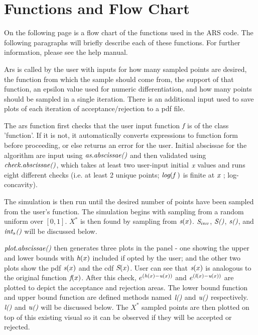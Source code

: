 \documentclass{article}\usepackage[]{graphicx}\usepackage[]{color}
\begin{document}
\section{Functions and Flow Chart}

On the following page is a flow chart of the functions used in the ARS code.  The following paragraphs will briefly describe each of these functions.  For further information, please see the help manual. 

Ars is called by the user with inputs for how many sampled points are desired, the function from which the sample should come from, the support of that function, an epsilon value used for numeric differentiation, and how many points should be sampled in a single iteration.  There is an additional input used to save plots of each iteration of acceptance$/$rejection to a pdf file.  

The ars function first checks that the user input function $\emph{f}$ is of the class 'function'.  If it is not, it automatically converts expressions to function form before proceeding, or else returns an error for the user.  Initial abscissae for the algorithm are input using $\emph{as.abscissae()}$ and then validated using $\emph{check.abscissae()}$, which takes at least two user-input initial $\emph{x}$ values and runs eight different checks (i.e. at least 2 unique points; $\emph{log}(\emph{f })$ is finite at $\emph{x }$; log-concavity). 

The simulation is then run until the desired number of points have been sampled from the user's function.  The simulation begins with sampling from a random uniform over $[0, 1]$.  $X^*$ is then found by sampling from $\emph{s}(x)$. $\emph{S}_{inv}$, $\emph{S}\emph{()}$, $\emph{s}\emph{()}$, and $\emph{int}_{s}\emph{()}$ will be discussed below.

$\emph{plot.abscissae()}$ then generates three plots in the panel - one showing the upper and lower bounds with $\emph{h}(x)$ included if opted by the user; and the other two plots show the pdf $\emph{s}(x)$ and the cdf $\emph{S}(x)$.  User can see that $\emph{s}(x)$ is analogous to the original function $\emph{f}(x)$.  After this check, $e^{( \emph{h}(x) - \emph{u}(x) )}$ and $e^{( \emph{l}(x) - \emph{u}(x) )}$ are plotted to depict the acceptance and rejection areas.  The lower bound function and upper bound function are defined methods named $\emph{l()}$ and $\emph{u()}$ respectively. $\emph{l()}$ and $\emph{u()}$ will be discussed below.  The $X^{*}$ sampled points are then plotted on top of this existing visual so it can be observed if they will be accepted or rejected.
\end{document}

